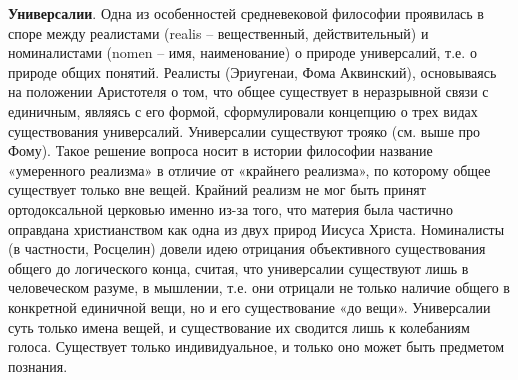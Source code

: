 \documentclass[12pt]{article}
\begin{document}
\textbf{Универсалии}.  Одна  из  особенностей  средневековой  философии  проявилась  в  споре  между  реалистами  (realis  –
вещественный, действительный) и номиналистами (nomen – имя, наименование) о природе универсалий, т.е. о
природе общих понятий. Реалисты (Эриугенаи, Фома Аквинский), основываясь на положении Аристотеля о том,
что общее существует в неразрывной связи с единичным, являясь с его формой, сформулировали концепцию о
трех видах существования универсалий. Универсалии существуют трояко (см. выше про Фому). Такое решение 
вопроса носит в истории философии название «умеренного реализма» в отличие от «крайнего реализма», по которому
общее существует только вне вещей. Крайний реализм не мог быть принят ортодоксальной церковью именно из-за
того, что материя была частично оправдана христианством как одна из двух природ Иисуса Христа.
Номиналисты  (в  частности, Росцелин)  довели  идею  отрицания  объективного  существования  общего  до
логического конца, считая, что универсалии существуют лишь в человеческом разуме, в мышлении, т.е. они
отрицали  не  только  наличие  общего  в  конкретной  единичной  вещи,  но  и  его  существование  «до  вещи».
Универсалии суть только имена вещей, и существование их сводится лишь к колебаниям голоса. Существует
только индивидуальное, и только оно может быть предметом познания.

\newpage
\end{document}
